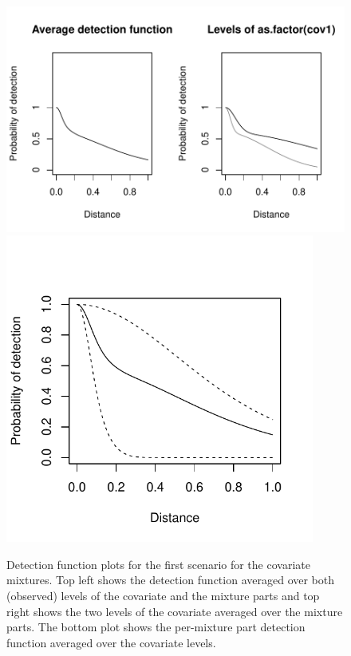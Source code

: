 \begin{figure}
\centering
\includegraphics[width=6in]{mix/figs/covsim1-detfct.pdf}
\includegraphics[width=4in]{mix/figs/covsim1-detfct-comp.pdf}
\caption{Detection function plots for the first scenario for the covariate mixtures. Top left shows the detection function averaged over both (observed) levels of the covariate and the mixture parts and top right shows the two levels of the covariate averaged over the mixture parts. The bottom plot shows the per-mixture part detection function averaged over the covariate levels.}
\label{mmds-cov1-detfct}
\end{figure}

